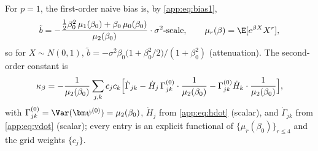 \begin{corollary}\label{app:cor:scalar}
For $p=1$, the first-order naive bias is, by \eqref{app:eq:bias1},
\[
  \tilde b=-\frac{\tfrac12\beta_0^{2}\,\mu_1(\beta_0)
        +\beta_0\,\mu_0(\beta_0)}{\mu_2(\beta_0)}\cdot\sigma^2\text{-scale},
  \qquad \mu_r(\beta)=\E[e^{\beta X}X^r],
\]
so for $X\sim N(0,1)$,
$\tilde b=-\sigma^2\beta_0\bigl(1+\beta_0^2/2\bigr)/(1+\beta_0^2)$
(attenuation). The second-order constant is
\[
  \kappa_\beta
  =-\frac{1}{\mu_2(\beta_0)}
   \sum_{j,k}c_jc_k\Bigl[
     \dot\Gamma_{jk}
     -\dot H_j\,\Gamma_{jk}^{(0)}\cdot\frac{1}{\mu_2(\beta_0)}
     -\Gamma_{jk}^{(0)}\dot H_k\cdot\frac{1}{\mu_2(\beta_0)}
   \Bigr],
\]
with $\Gamma_{jk}^{(0)}=\Var(\bm\psi^{(0)})=\mu_2(\beta_0)$,
$\dot H_j$ from \eqref{app:eq:hdot} (scalar), and $\dot\Gamma_{jk}$ from
\eqref{app:eq:vdot} (scalar); every entry is an explicit functional of
$\{\mu_r(\beta_0)\}_{r\le4}$ and the grid weights $\{c_j\}$.
\end{corollary}

